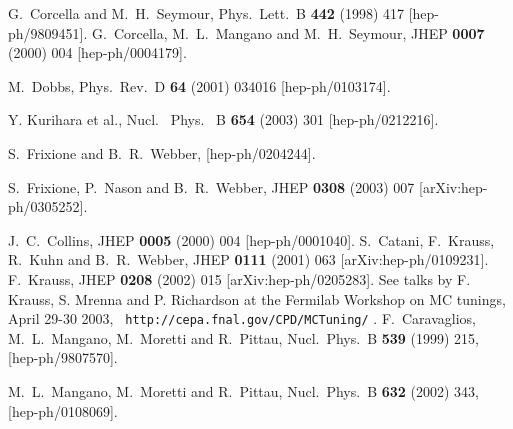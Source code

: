 \documentclass[paper]{JHEP3}
\begin{document}
\begin{thebibliography}{99}
G.~Corcella and M.~H.~Seymour,
Phys.\ Lett.\ B {\bf 442} (1998) 417
[hep-ph/9809451].
G.~Corcella, M.~L.~Mangano and M.~H.~Seymour,
JHEP {\bf 0007} (2000) 004
[hep-ph/0004179].

M.~Dobbs,
Phys.\ Rev.\ D {\bf 64} (2001) 034016
[hep-ph/0103174].

Y. Kurihara et al., Nucl. \ Phys. \ B {\bf 654} (2003) 301
[hep-ph/0212216].

S.~Frixione and B.~R.~Webber,
[hep-ph/0204244].

S.~Frixione, P.~Nason and B.~R.~Webber,
JHEP {\bf 0308} (2003) 007
[arXiv:hep-ph/0305252].

J.~C.~Collins,
JHEP {\bf 0005} (2000) 004
[hep-ph/0001040].
S.~Catani, F.~Krauss, R.~Kuhn and B.~R.~Webber,
JHEP {\bf 0111} (2001) 063
[arXiv:hep-ph/0109231].
F.~Krauss,
JHEP {\bf 0208} (2002) 015
[arXiv:hep-ph/0205283].
See talks by F. Krauss, S. Mrenna and P. Richardson at the Fermilab
Workshop on MC tunings, April 29-30 2003, {\tt
  http://cepa.fnal.gov/CPD/MCTuning/} .
F.~Caravaglios, M.~L.~Mangano, M.~Moretti and R.~Pittau,
Nucl.\ Phys.\ B {\bf 539} (1999) 215,
[hep-ph/9807570].

M.~L.~Mangano, M.~Moretti and R.~Pittau,
Nucl.\ Phys.\ B {\bf 632} (2002) 343, [hep-ph/0108069].


\end{thebibliography}
\end{document}
